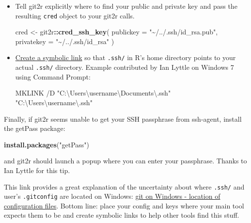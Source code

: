 \documentclass[
]{book}
\newenvironment{Shaded}{\begin{snugshade}}{\end{snugshade}}
\newcommand{\AttributeTok}[1]{\textcolor[rgb]{0.13,0.29,0.53}{#1}}
\newcommand{\FunctionTok}[1]{\textcolor[rgb]{0.13,0.29,0.53}{\textbf{#1}}}
\newcommand{\NormalTok}[1]{#1}
\newcommand{\OtherTok}[1]{\textcolor[rgb]{0.56,0.35,0.01}{#1}}
\newcommand{\SpecialCharTok}[1]{\textcolor[rgb]{0.81,0.36,0.00}{\textbf{#1}}}
\newcommand{\StringTok}[1]{\textcolor[rgb]{0.31,0.60,0.02}{#1}}
\begin{document}
\begin{itemize}
\item
  Tell git2r explicitly where to find your public and private key and pass the resulting \texttt{cred} object to your git2r calls.

\begin{Shaded}
\begin{Highlighting}[]
\NormalTok{cred }\OtherTok{\textless{}{-}}\NormalTok{ git2r}\SpecialCharTok{::}\FunctionTok{cred\_ssh\_key}\NormalTok{(}
  \AttributeTok{publickey =} \StringTok{"\textasciitilde{}/../.ssh/id\_rsa.pub"}\NormalTok{,}
  \AttributeTok{privatekey =} \StringTok{"\textasciitilde{}/../.ssh/id\_rsa"}
\NormalTok{)}
\end{Highlighting}
\end{Shaded}
\item
  \href{https://www.howtogeek.com/howto/16226/complete-guide-to-symbolic-links-symlinks-on-windows-or-linux/}{Create a symbolic link} so that \texttt{.ssh/} in R's home directory points to your actual \texttt{.ssh/} directory. Example contributed by Ian Lyttle on Windows 7 using Command Prompt:

\begin{Shaded}
\begin{Highlighting}[]
\NormalTok{MKLINK /D "C:\textbackslash{}Users\textbackslash{}username\textbackslash{}Documents\textbackslash{}.ssh" "C:\textbackslash{}Users\textbackslash{}username\textbackslash{}.ssh"}
\end{Highlighting}
\end{Shaded}
\end{itemize}

Finally, if git2r seems unable to get your SSH passphrase from ssh-agent, install the getPass package:

\begin{Shaded}
\begin{Highlighting}[]
\FunctionTok{install.packages}\NormalTok{(}\StringTok{"getPass"}\NormalTok{)}
\end{Highlighting}
\end{Shaded}

and git2r should launch a popup where you can enter your passphrase.
Thanks to Ian Lyttle for this tip.

This link provides a great explanation of the uncertainty about where \texttt{.ssh/} and user's \texttt{.gitconfig} are located on Windows: \href{https://www.onwebsecurity.com/configuration/git-on-windows-location-of-global-configuration-file.html}{git on Windows - location of configuration files}.
Bottom line: place your config and keys where your main tool expects them to be and create symbolic links to help other tools find this stuff.
\end{document}
